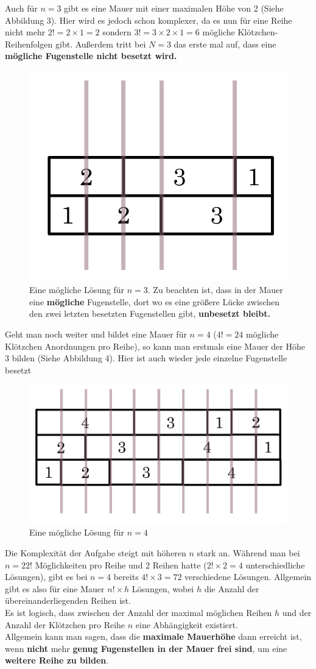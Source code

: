 \documentclass[a4paper,12pt]{article}
\begin{document}
Auch für $n = 3$ gibt es eine Mauer mit einer maximalen Höhe von 2 (Siehe Abbildung 3). Hier wird es jedoch schon komplexer, da es nun für eine Reihe nicht mehr $2! = 2\times1 = 2$ sondern $3! = 3\times2\times1 = 6$ mögliche Klötzchen-Reihenfolgen gibt.
Außerdem tritt bei $N = 3$ das erste mal auf, dass eine \textbf{mögliche Fugenstelle nicht besetzt wird.}
\begin{figure}[H]
    \centering
    \includegraphics[width=0.5\linewidth]{Bilder/Aufgabe1/Loesung_N3.png}
    \caption{Eine mögliche Lösung für $n = 3$. Zu beachten ist, dass in der Mauer eine \textbf{mögliche} Fugenstelle, dort wo es eine größere Lücke zwischen den zwei letzten besetzten Fugenstellen gibt, \textbf{unbesetzt bleibt.}}
\end{figure}

Geht man noch weiter und bildet eine Mauer für $n = 4$ ($4! = 24$ mögliche Klötzchen Anordnungen pro Reihe), so kann man erstmals eine Mauer der Höhe 3 bilden (Siehe Abbildung 4). Hier ist auch wieder jede einzelne Fugenstelle besetzt
\begin{figure}[H]
    \centering
    \includegraphics[width=0.7\linewidth]{Bilder/Aufgabe1/Loesung_N4.png}
    \caption{Eine mögliche Lösung für $n = 4$}
\end{figure}

Die Komplexität der Aufgabe steigt mit höheren $n$ stark an. Während man bei $n = 2 2!$ Möglichkeiten pro Reihe und 2 Reihen hatte ($2!\times2 = 4$ unterschiedliche Lösungen), gibt es bei $n = 4$ bereits $4!\times3 = 72$ verschiedene Lösungen.
Allgemein gibt es also für eine Mauer $n!\times h$ Lösungen, wobei $h$ die Anzahl der übereinanderliegenden Reihen ist.
\\[0.4cm]
Es ist logisch, dass zwischen der Anzahl der maximal möglichen Reihen $h$ und der Anzahl der Klötzchen pro Reihe $n$ eine Abhängigkeit existiert.
\\[0.4cm]
Allgemein kann man sagen, dass die \textbf{maximale Mauerhöhe} dann erreicht ist, wenn \textbf{nicht} mehr \textbf{genug Fugenstellen in der Mauer frei sind}, um eine \textbf{weitere Reihe zu bilden}.
\end{document}

